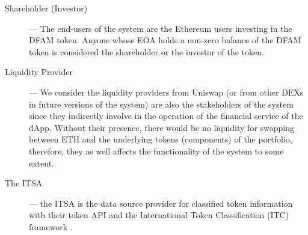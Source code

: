 \begin{description}
	\item[Shareholder (Investor)] --- The end-users of the system are the Ethereum users investing in the DFAM token. Anyone whose EOA holds a non-zero balance of the DFAM token is considered the shareholder or the investor of the token. 

	\item[Liquidity Provider] --- We consider the liquidity providers from Uniswap (or from other DEXs in future versions of the system) are also the stakeholders of the system since they indirectly involve in the operation of the financial service of the dApp. Without their presence, there would be no liquidity for swapping between ETH and the underlying tokens (components) of the portfolio, therefore, they as well affects the functionality of the system to some extent.

	\item[The ITSA] ---  the ITSA is the data source provider for classified token information with their token API and the International Token Classification (ITC) framework \cite{itcDocs}.
	
	
	
\end{description}




